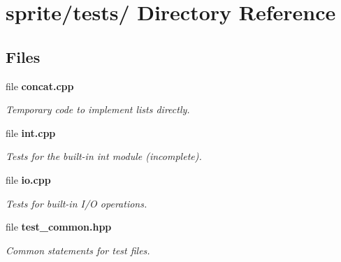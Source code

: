 \section{sprite/tests/ Directory Reference}
\label{dir_000002}
\subsection*{Files}
\begin{CompactItemize}
\item 
file {\bf concat.cpp}
\begin{CompactList}\small\item\em Temporary code to implement lists directly. \item\end{CompactList}

\item 
file {\bf int.cpp}
\begin{CompactList}\small\item\em Tests for the built-in int module (incomplete). \item\end{CompactList}

\item 
file {\bf io.cpp}
\begin{CompactList}\small\item\em Tests for built-in I/O operations. \item\end{CompactList}

\item 
file {\bf test\_\-common.hpp}
\begin{CompactList}\small\item\em Common statements for test files. \item\end{CompactList}

\end{CompactItemize}
